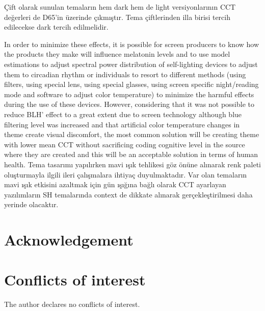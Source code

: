 \documentclass{article}
\begin{document}
Çift olarak sunulan temaların hem dark hem de light versiyonlarının CCT değerleri de D65'in üzerinde çıkmıştır. Tema çiftlerinden illa birisi tercih edilecekse dark tercih edilmelidir.

In order to minimize these effects, it is possible for screen producers to know how the  products they make will influence melatonin levels and to use model estimations to adjust spectral power distribution of self-lighting devices to adjust them to circadian rhythm or individuals to resort to different methods (using filters, using special lens, using special glasses, using screen specific night/reading mode and software to adjust color temperature) to minimize the harmful effects during the use of these devices. However, considering that it was not possible to reduce BLH' effect to a great extent due to screen technology although blue filtering level was increased and that artificial color temperature changes in theme create visual discomfort, the most common solution will be creating theme with lower mean CCT without sacrificing coding cognitive level in the source where they are created and this will be an acceptable solution in terms of human health. Tema tasarımı yapılırken mavi ışık tehlikesi göz önüne alınarak renk paleti oluşturmayla ilgili ileri çalışmalara ihtiyaç duyulmaktadır. Var olan temaların mavi ışık etkisini azaltmak için gün ışığına bağlı olarak CCT ayarlayan yazılımların SH temalarında context de dikkate alınarak gerçekleştirilmesi daha yerinde olacaktır.

\section*{Acknowledgement}
\section*{Conflicts of interest}
The author declares no conflicts of interest.



\end{document}
